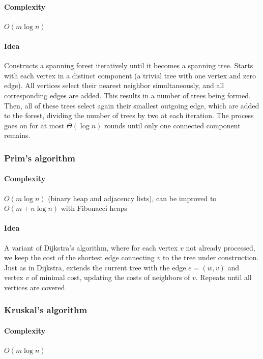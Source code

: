 \documentclass[a4paper]{article}
\begin{document}
\paragraph{Complexity} $O\left(m \log n\right)$

\paragraph{Idea} Constructs a spanning forest iteratively until it becomes a spanning tree. Starts with each vertex in a distinct component (a trivial tree with one vertex and zero edge). All vertices select their nearest neighbor simultaneously, and all corresponding edges are added. This results in a number of trees being formed. Then, all of these trees select again their smallest outgoing edge, which are added to the forest, dividing the number of trees by two at each iteration. The process goes on for at most $\Theta\left(\log n\right)$ rounds until only one connected component remains.

\subsubsection{Prim's algorithm}

\paragraph{Complexity} $O\left(m \log n\right)$ (binary heap and adjacency lists), can be improved to $O\left(m + n\log n\right)$ with Fibonacci heaps

\paragraph{Idea} A variant of Dijkstra's algorithm, where for each vertex $v$ not already processed, we keep the cost of the shortest edge connecting $v$ to the tree under construction. Just as in Dijkstra, extends the current tree with the edge $e=\left(w,v\right)$ and vertex $v$ of minimal cost, updating the costs of neighbors of $v$. Repeats until all vertices are covered.

\subsubsection{Kruskal's algorithm}

\paragraph{Complexity} $O\left(m \log n\right)$
\end{document}
